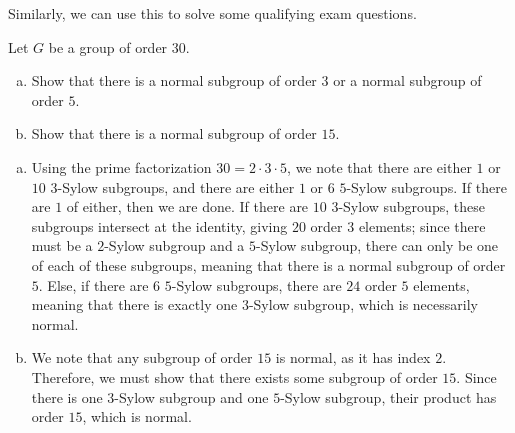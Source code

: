 \documentclass[10pt]{mypackage}
\begin{document}
Similarly, we can use this to solve some qualifying exam questions.
\begin{exercise}
  Let $G$ be a group of order $30$.
  \begin{enumerate}[(a)]
    \item Show that there is a normal subgroup of order $3$ or a normal subgroup of order $5$.
    \item Show that there is a normal subgroup of order $15$.
  \end{enumerate}
\end{exercise}
\begin{solution}\hfill
  \begin{enumerate}[(a)]
    \item Using the prime factorization $30 = 2\cdot 3 \cdot 5$, we note that there are either $1$ or $10$ $3$-Sylow subgroups, and there are either $1$ or $6$ $5$-Sylow subgroups. If there are $1$ of either, then we are done. If there are $10$ $3$-Sylow subgroups, these subgroups intersect at the identity, giving $20$ order $3$ elements; since there must be a $2$-Sylow subgroup and a $5$-Sylow subgroup, there can only be one of each of these subgroups, meaning that there is a normal subgroup of order $5$. Else, if there are $6$ $5$-Sylow subgroups, there are $24$ order $5$ elements, meaning that there is exactly one $3$-Sylow subgroup, which is necessarily normal.
    \item We note that any subgroup of order $15$ is normal, as it has index $2$. Therefore, we must show that there exists some subgroup of order $15$. Since there is one $3$-Sylow subgroup and one $5$-Sylow subgroup, their product has order $15$, which is normal.
  \end{enumerate}
\end{solution}
\end{document}
